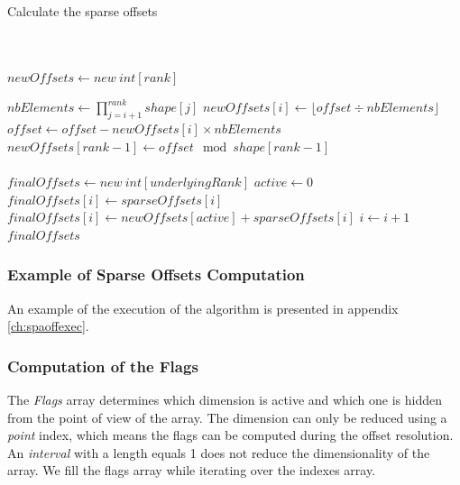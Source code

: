 \begin{algorithm}
	\caption{Calculate the sparse offsets}
	\label{alg:sparseOffsets}
\begin{algorithmic}
	\Statex
	\\
	\\
	\State $newOffsets\gets new\ int[rank]$ 
	
	\State $nbElements \gets \prod_{j=i+1}^{rank} shape[j]$
	\State $newOffsets[i] \gets \lfloor offset \div nbElements\rfloor$
	\State $offset \gets offset - newOffsets[i] \times nbElements$
	\EndFor
	\State $newOffsets[rank-1] \gets offset \mod shape[rank-1]$ 
	\\
	\\	
	\State $finalOffsets\gets new\ int[underlyingRank]$	
	\State $active\gets 0$
	 
	\State $finalOffsets[i] \gets sparseOffsets[i]$
	\Else
	\State $finalOffsets[i] \gets newOffsets[active] + sparseOffsets[i]$
	\State $i \gets i + 1$
	\EndIf
	\EndFor
	\Return $finalOffsets$
\EndProcedure
\end{algorithmic}
\end{algorithm}

\subsubsection{Example of Sparse Offsets Computation}
An example of the execution of the algorithm is presented in appendix \ref{ch:spaoffexec}.

\subsubsection{Computation of the Flags}
The \textit{Flags} array determines which dimension is active and which one is hidden from the point of view of the array. The \textbf{}dimension can only be reduced using a \textit{point} index, which means the flags can be computed during the offset resolution. An \textit{interval} with a length equals 1 does not reduce the dimensionality of the array. We fill the flags array while iterating over the indexes array.

